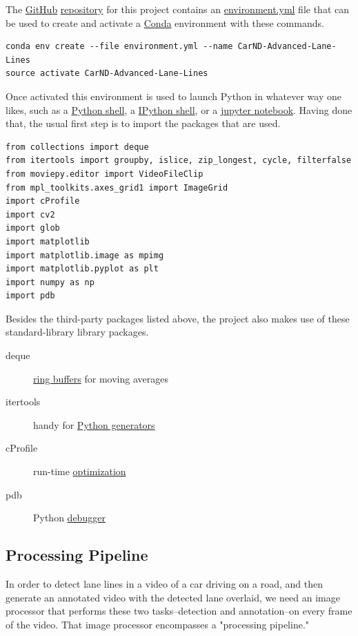 \documentclass[11pt]{article}
\begin{document}
The \href{https://github.com/}{GitHub} \href{https://github.com/dventimi/CarND-Advanced-Lane-Lines}{repository} for this project contains an \href{environment.yml}{environment.yml}
file that can be used to create and activate a \href{https://conda.io/docs/}{Conda} environment
with these commands.

\begin{verbatim}
conda env create --file environment.yml --name CarND-Advanced-Lane-Lines
source activate CarND-Advanced-Lane-Lines
\end{verbatim}

Once activated this environment is used to launch Python in
whatever way one likes, such as a \href{https://www.python.org/shell/}{Python shell}, a \href{https://ipython.org/}{IPython shell},
or a \href{http://jupyter.org/}{jupyter notebook}.  Having done that, the usual first step is
to import the packages that are used.  

\begin{verbatim}
from collections import deque
from itertools import groupby, islice, zip_longest, cycle, filterfalse
from moviepy.editor import VideoFileClip
from mpl_toolkits.axes_grid1 import ImageGrid
import cProfile
import cv2
import glob
import matplotlib
import matplotlib.image as mpimg
import matplotlib.pyplot as plt
import numpy as np
import pdb
\end{verbatim}

Besides the third-party packages listed above, the project also
makes use of these standard-library library packages.

\begin{description}
\item[{deque}] \href{https://en.wikipedia.org/wiki/Circular_buffer}{ring buffers} for moving averages
\item[{itertools}] handy for \href{http://davidaventimiglia.com/python_generators.html}{Python generators}
\item[{cProfile}] run-time \href{https://docs.python.org/2/library/profile.html}{optimization}
\item[{pdb}] Python \href{https://docs.python.org/3/library/pdb.html}{debugger}
\end{description}


\subsection*{Processing Pipeline}
\label{sec-1-2}

In order to detect lane lines in a video of a car driving on a
road, and then generate an annotated video with the detected lane
overlaid, we need an image processor that performs these two
tasks--detection and annotation--on every frame of the video.
That image processor encompasses a "processing pipeline."  
\end{document}

